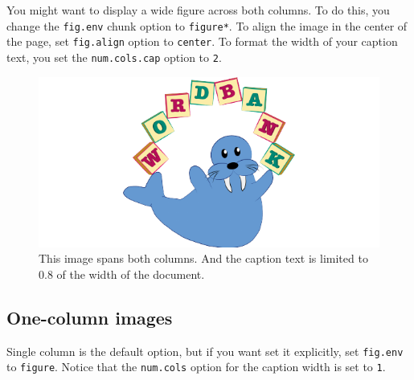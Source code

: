 \documentclass[10pt, letterpaper]{article}
\newenvironment{CodeChunk}{}{}
\begin{document}
You might want to display a wide figure across both columns. To do this,
you change the \texttt{fig.env} chunk option to \texttt{figure*}. To
align the image in the center of the page, set \texttt{fig.align} option
to \texttt{center}. To format the width of your caption text, you set
the \texttt{num.cols.cap} option to \texttt{2}.

\begin{CodeChunk}
\begin{figure}[h]

{\centering \includegraphics{figs/2-col-image-1} 

}

\caption[This image spans both columns]{This image spans both columns. And the caption text is limited to 0.8 of the width of the document.}\label{fig:2-col-image}
\end{figure}
\end{CodeChunk}

\hypertarget{one-column-images}{%
\subsection{One-column images}\label{one-column-images}}

Single column is the default option, but if you want set it explicitly,
set \texttt{fig.env} to \texttt{figure}. Notice that the
\texttt{num.cols} option for the caption width is set to \texttt{1}.
\end{document}
